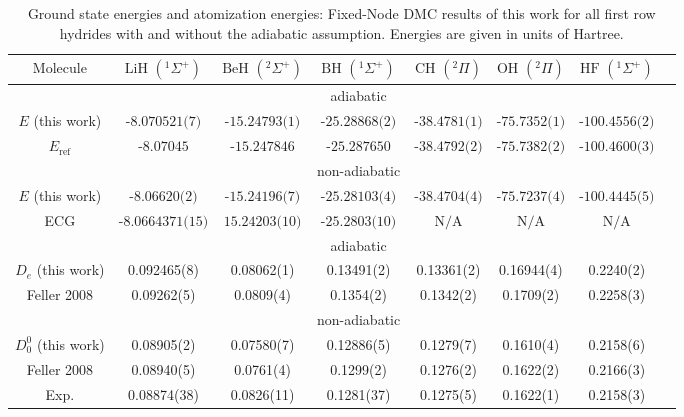 \documentclass[pra,superscriptaddress,groupedaddress,twocolumn]{revtex4}
\begin{document}
\begin{table}[t!]
\setlength{\extrarowheight}{1pt}
\begin{threeparttable}
\caption{Ground state energies and atomization energies: Fixed-Node DMC results of this work for all first row hydrides with and without the adiabatic assumption. Energies are given in units of Hartree. \label{tab:atomization}}
\begin{tabular*}{\textwidth}{@{\extracolsep{\fill}} cccccccc}
\hline\hline
$\text{Molecule}$ & $\text{LiH }(^1\Sigma^+)$ & $\text{BeH }(^2\Sigma^+)$ & $\text{BH }(^1\Sigma^+)$ & $\text{CH }(^2\Pi)$ & $\text{OH }(^2\Pi)$ & $\text{HF }(^1\Sigma^+)$ \\ \hline
&&&adiabatic&&& \\
$E$ (this work) & $\text{-8.070521(7)}$ & $\text{-15.24793(1)}$ & $\text{-25.28868(2)}$ & $\text{-38.4781(1)}$ & $\text{-75.7352(1)}$ & $\text{-100.4556(2)}$ \\
$E_{\text{ref}}$ \tnote{a} \cite{Adamowicz_LiH,Koput_BeH,Miliordos_BH,Davidson_Atoms,Feller_Corrections} & $\text{-8.07045}$ & $\text{-15.247846}$ & $\text{-25.287650}$ & $\text{-38.4792(2)}$ & $\text{-75.7382(2)}$ & $\text{-100.4600(3)}$ \\
&&&non-adiabatic&&& \\
$E$ (this work) & $\text{-8.06620(2)}$ & $\text{-15.24196(7)}$ & $\text{-25.28103(4)}$ & $\text{-38.4704(4)}$ & $\text{-75.7237(4)}$ & $\text{-100.4445(5)}$ \\
ECG \cite{Bubin_LiH_noBO,Bubin_BeH_noBO,Bubin_BH_noBO} & $\text{-8.0664371(15)}$ & $\text{15.24203(10)}$ & $\text{-25.2803(10)}$ & $\text{N/A}$ & $\text{N/A}$ & $\text{N/A}$ \\
\hline
&&&adiabatic&&& \\
$D_{e}$ (this work) & 0.092465(8) & 0.08062(1) & 0.13491(2) & 0.13361(2) & 0.16944(4) & 0.2240(2) \\
Feller 2008\tnote{b} \cite{Feller_Corrections} & 0.09262(5) & 0.0809(4) & 0.1354(2) & 0.1342(2) & 0.1709(2) & 0.2258(3) \\
&&&non-adiabatic&&& \\
$D_{0}^0$ (this work) & 0.08905(2)  & 0.07580(7)  & 0.12886(5) & 0.1279(7) & 0.1610(4) & 0.2158(6) \\
Feller 2008\tnote{c} \cite{Feller_Corrections} & 0.08940(5) & 0.0761(4) & 0.1299(2) & 0.1276(2) & 0.1622(2) & 0.2166(3)\\
Exp. \cite{CCCBDB} & 0.08874(38) & 0.0826(11) & 0.1281(37) & 0.1275(5) & 0.1622(1) & 0.2158(3) \\

\end{tabular*}
\end{threeparttable}
\end{table}
\end{document}
